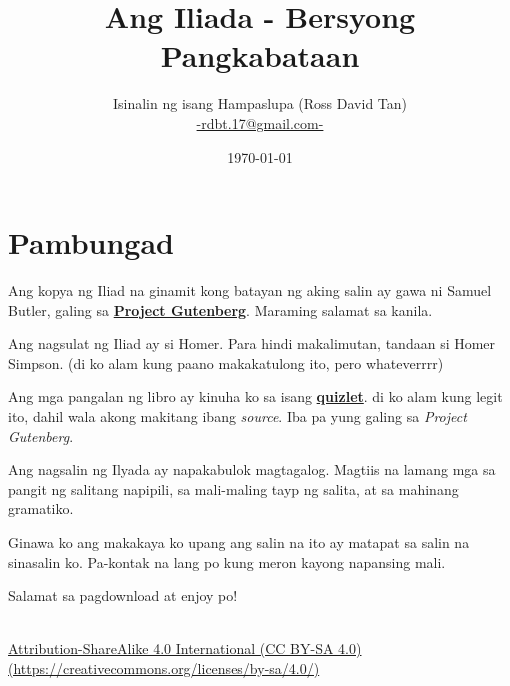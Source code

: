 \documentclass[12pt,letterpaper]{report}
\begin{document}
\title{\textbf{Ang Iliada - Bersyong Pangkabataan}}
\author{Isinalin ng isang Hampaslupa (Ross David Tan) \\ \href{mailto:rdbt.17@gmail.com}{-rdbt.17@gmail.com-}}
\date{\today}
\maketitle

\tableofcontents
\pagebreak

\setlength{\parskip}{1em}

\chapter*{Pambungad}
\begin{center}

    Ang kopya ng Iliad na ginamit kong batayan ng aking salin ay gawa ni Samuel Butler, galing sa \href{https://www.gutenberg.org/}{\textbf{Project Gutenberg}}. Maraming salamat sa kanila.

    Ang nagsulat ng Iliad ay si Homer. Para hindi makalimutan, tandaan si Homer Simpson. (di ko alam kung paano makakatulong ito, pero whateverrrr)

    Ang mga pangalan ng libro ay kinuha ko sa isang \href{https://quizlet.com/24340225/titles-of-each-book-in-the-iliad-flash-cards/}{\textbf{quizlet}}.
    di ko alam kung legit ito, dahil wala akong makitang ibang \textit{source}. Iba pa yung galing sa \textit{Project Gutenberg}.

    Ang nagsalin ng Ilyada ay napakabulok magtagalog. Magtiis na lamang mga sa pangit ng salitang napipili, sa mali-maling tayp ng salita, at sa mahinang gramatiko.

    Ginawa ko ang makakaya ko upang ang salin na ito ay matapat sa salin na sinasalin ko. Pa-kontak na lang po kung meron kayong napansing mali.

    Salamat sa pagdownload at enjoy po!
    \vspace*{\fill}
\end{center}
\pagebreak

\vspace*{\fill}
\begin{center}
    \href{https://creativecommons.org/licenses/by-sa/4.0/}{\ccbysa \\[0.5cm] Attribution-ShareAlike 4.0 International (CC BY-SA 4.0) \\ (https://creativecommons.org/licenses/by-sa/4.0/)}
    
\end{center}
\vspace*{\fill}
\end{document}
